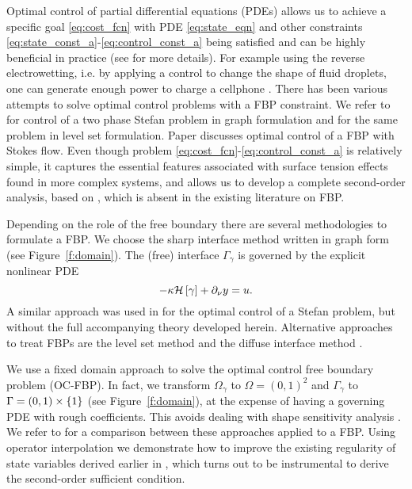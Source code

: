 \documentclass[final]{siamltex}
\begin{document}
Optimal control of partial differential equations (PDEs) allows us to achieve a specific goal \eqref{eq:cost_fcn} with 
PDE \eqref{eq:state_eqn} and other constraints \eqref{eq:state_const_a}-\eqref{eq:control_const_a} being satisfied 
and can be highly beneficial in practice (see \cite{FTroltzsch_2010a} for more details). 
For example using the reverse electrowetting, i.e. by applying a control to change the shape of fluid droplets,
one can generate enough power to charge a cellphone \cite{TKrupenkin_JATaylor_2011a}.
There has been various attempts to solve optimal control problems with a FBP constraint. 
We refer to \cite{MHinze_SZiegenbalg_2007b, MHinze_SZiegenbalg_2007a} for control
of a two phase Stefan problem in graph formulation and \cite{MKBernauer_RHerzog} for the same problem
in level set formulation. Paper \cite{SRepke_NMarheineke_RPinnau2010a} discusses optimal control
of a FBP with Stokes flow. 
Even though problem \eqref{eq:cost_fcn}-\eqref{eq:control_const_a} is relatively simple, it captures the essential features associated with surface tension effects found in more complex systems, and allows us to develop a complete second-order analysis, 
based on \cite{FTroltzsch_2010a}, which is absent in the existing literature on FBP.

Depending on the role of the free boundary there are several methodologies to formulate a FBP. We choose the sharp interface method written in graph form (see Figure~\ref{f:domain}). The (free) interface $\Gamma_\gamma$ is governed by the explicit nonlinear PDE
	\[
		-\kappa \mathcal H\sbr{\gamma} + {{\partial_{\nu}}} y =  u. 
	\]
A similar approach was used in \cite{MHinze_SZiegenbalg_2007b, MHinze_SZiegenbalg_2007a}
for the optimal control of a Stefan problem, but without the full accompanying theory developed herein. Alternative approaches to treat FBPs are the level set method and the diffuse
interface method \cite{KDeckelnick_GDziuk_CElliott_2005a,MKBernauer_RHerzog}.

We use a fixed domain approach to solve the optimal control free boundary problem (OC-FBP). In fact, we transform $\Omega_\gamma$ to $\Omega=(0,1)^2$ and $\Gamma_\gamma$ to $\Gamma=(0,1)\times\set{1}$ (see Figure~\ref{f:domain}), at the expense of having a governing PDE with rough coefficients. This avoids dealing with shape sensitivity analysis \cite{JSokolowski_JPZolesio_1992,
MDelfour_JZolesio2011}. We refer to \cite{KVZee_EBrummelen_IAkkerman_RBorst_2010a} for a comparison 
between these approaches applied to a FBP. Using operator interpolation \cite{LTartar_2007} we
demonstrate how to improve the existing regularity of state variables derived earlier in
\cite{PSaavedra_RScott_1991}, which turns out to be instrumental to derive the second-order sufficient condition. 
\end{document}
